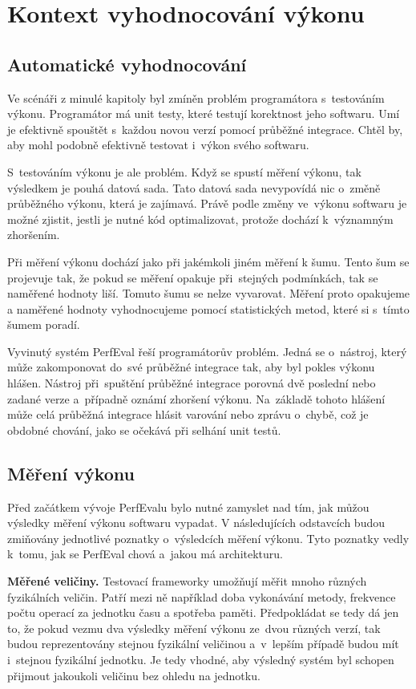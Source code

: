 \chapter{Kontext vyhodnocování výkonu}

\section{Automatické vyhodnocování}
Ve scénáři z minulé kapitoly byl zmíněn problém programátora s~testováním výkonu. Programátor má unit
testy, které testují korektnost jeho softwaru. Umí je efektivně spouštět s~každou novou verzí
pomocí průběžné integrace. Chtěl by, aby mohl podobně efektivně testovat i~výkon svého softwaru.

S~testováním výkonu je ale problém. Když se spustí měření výkonu, tak výsledkem je pouhá
datová sada. Tato datová sada nevypovídá nic o~změně průběžného výkonu, která
je zajímavá. Právě podle změny ve~výkonu softwaru je možné zjistit, jestli je nutné
kód optimalizovat, protože dochází k~významným zhoršením.

Při měření výkonu dochází jako při jakémkoli jiném měření k šumu. Tento šum se projevuje
tak, že pokud se měření opakuje při~stejných podmínkách, tak se naměřené hodnoty liší.
Tomuto šumu se nelze vyvarovat. Měření proto opakujeme a naměřené hodnoty vyhodnocujeme
pomocí statistických metod, které si s~tímto šumem poradí.

Vyvinutý systém PerfEval řeší programátorův problém. Jedná se o~nástroj, který může
zakomponovat do~své průběžné integrace tak, aby byl pokles výkonu hlášen. Nástroj
při~spuštění průběžné integrace porovná dvě poslední nebo zadané verze a~případně oznámí zhoršení výkonu.
Na~základě tohoto hlášení může celá průběžná integrace hlásit varování nebo zprávu o~chybě, což je obdobné chování,
jako se očekává při selhání unit testů.

\section{Měření výkonu}

Před začátkem vývoje PerfEvalu bylo nutné zamyslet nad tím, jak můžou výsledky měření výkonu softwaru vypadat.
V následujících odstavcích budou zmiňovány jednotlivé poznatky o~výsledcích měření výkonu.
Tyto poznatky vedly k~tomu, jak se PerfEval chová a~jakou má architekturu.

\bigskip
\noindent\textbf{Měřené veličiny.} Testovací frameworky umožňují měřit mnoho různých fyzikálních veličin. Patří mezi ně například
doba vykonávání metody, frekvence počtu operací za jednotku času a spotřeba paměti.
Předpokládat se tedy dá jen to, že pokud vezmu dva výsledky měření výkonu ze~dvou různých
verzí, tak budou reprezentovány stejnou fyzikální veličinou a~v~lepším případě budou mít
i~stejnou fyzikální jednotku. Je tedy vhodné, aby výsledný systém byl schopen přijmout
jakoukoli veličinu bez ohledu na jednotku.

